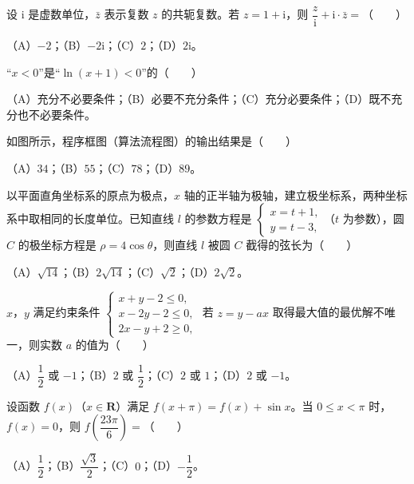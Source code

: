 \begin{question}
设 $\mathrm i$ 是虚数单位，$\bar z$ 表示复数 $z$ 的共轭复数。若 $z=1+\mathrm i$，则 $\dfrac{z}{\mathrm i}+\mathrm i\cdot\bar z=$\mbox{（　　）}

（A）$-2$；（B）$-2\mathrm i$；（C）$2$；（D）$2\mathrm i$。

\end{question}
\begin{question}
“$x<0$”是“$\ln(x+1)<0$”的\mbox{（　　）}

（A）充分不必要条件；（B）必要不充分条件；（C）充分必要条件；（D）既不充分也不必要条件。

\Needspace{0.4\textheight}
\end{question}
\begin{question}
如图所示，程序框图（算法流程图）的输出结果是\mbox{（　　）}

（A）$34$；（B）$55$；（C）$78$；（D）$89$。
\nopagebreak[4]
\begin{center}\end{center}
\nopagebreak[4]
\end{question}
\begin{question}
以平面直角坐标系的原点为极点，$x$ 轴的正半轴为极轴，建立极坐标系，两种坐标系中取相同的长度单位。已知直线 $l$ 的参数方程是 $\begin{cases}x=t+1,\\y=t-3,\end{cases}$（$t$ 为参数），圆 $C$ 的极坐标方程是 $\rho=4\cos\theta$，则直线 $l$ 被圆 $C$ 截得的弦长为\mbox{（　　）}

（A）$\sqrt{14}$；（B）$2\sqrt{14}$；（C）$\sqrt2$；（D）$2\sqrt2$。

\end{question}
\begin{question}
$x$，$y$ 满足约束条件 $\begin{cases}x+y-2\leqslant0,\\x-2y-2\leqslant0,\\2x-y+2\geqslant0,\end{cases}$ 若 $z=y-ax$ 取得最大值的最优解不唯一，则实数 $a$ 的值为\mbox{（　　）}

（A）$\dfrac12$ 或 $-1$；（B）$2$ 或 $\dfrac12$；（C）$2$ 或 $1$；（D）$2$ 或 $-1$。

\end{question}
\begin{question}
设函数 $f(x)$（$x\in\mathbf R$）满足 $f(x+\pi)=f(x)+\sin x$。当 $0\leqslant x<\pi$ 时，$f(x)=0$，则 $f\left(\dfrac{23\pi}6\right)=$\mbox{（　　）}

（A）$\dfrac12$；（B）$\dfrac{\sqrt3}2$；（C）$0$；（D）$-\dfrac12$。

\Needspace{0.4\textheight}
\end{question}
